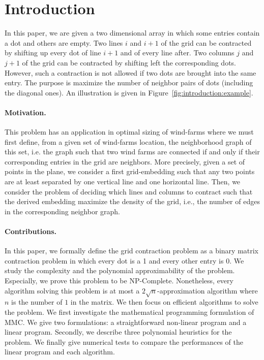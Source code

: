 \section{Introduction}
\label{sect:intro}


In this paper, we are given a two dimensional array in which some entries contain a dot and others are empty. Two lines $i$ and $i+1$ of the grid can be contracted by shifting up every dot of line $i+1$ and of every line after. Two columns $j$ and $j+1$ of the grid can be contracted by shifting left the corresponding dots. However, such a contraction is not allowed if two dots are brought into the same entry. The purpose is maximize the number of neighbor pairs of dots (including the diagonal ones). An illustration is given in Figure~\ref{fig:introduction:example}.




\paragraph{Motivation. }
This problem has an application in optimal sizing of wind-farms \cite{Pillai2015} where we must first define, from a given set of wind-farms location, the neighborhood graph of this set, i.e. the graph such that two wind farms are connected if and only if their corresponding entries in the grid are neighbors. More precisely, given a set of points in the plane, we consider a first grid-embedding such that any two points are at least separated by one vertical line and one horizontal line. Then, we consider the problem of deciding which lines and columns to contract such that the derived embedding maximize the density of the grid, i.e., the number of edges in the corresponding neighbor graph.
\vspace{-0.2cm}
\paragraph{Contributions. } In this paper, we formally define the grid contraction problem as a binary matrix contraction problem in which every dot is a 1 and every other entry is 0. We study the complexity and the polynomial approximability of the problem. Especially, we prove this problem to be NP-Complete. Nonetheless, every algorithm solving this problem is at most a $2\sqrt{n}$-approximation algorithm where $n$ is the number of $1$ in the matrix. We then focus on efficient algorithms to solve the problem. We first investigate the mathematical programming formulation of MMC. We give two formulations: a straightforward non-linear program and a linear program.
Secondly, we describe three polynomial heuristics for the problem. We finally give numerical tests to compare the performances of the linear program and each algorithm. 

